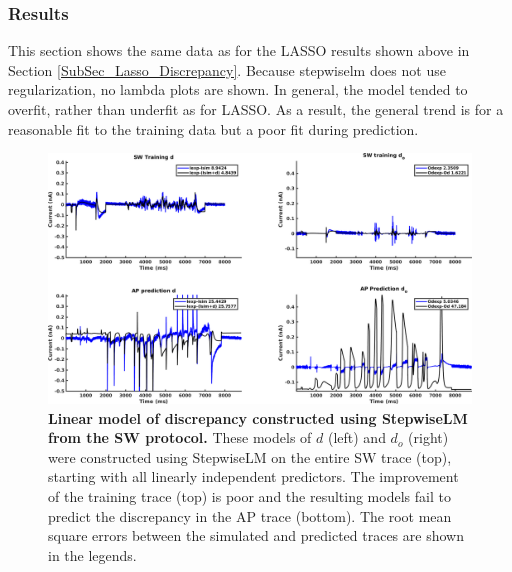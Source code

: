 \documentclass[11pt,a4paper,oneside]{article}
\begin{document}
\subsubsection{Results}\label{SubSubSec_StepwiseLM_Results}
This section shows the same data as for the LASSO results shown above in Section \ref{SubSec_Lasso_Discrepancy}. Because stepwiselm does not use regularization, no lambda plots are shown. In general, the model tended to overfit, rather than underfit as for LASSO. As a result, the general trend is for a reasonable fit to the training data but a poor fit during prediction.

\begin{figure}[t]
\begin{center}
\includegraphics[scale=0.42]{Figures/StepwiseLM_SW_AP_full_discrepancy.png}
\caption{\textbf{Linear model of discrepancy constructed using StepwiseLM from the SW protocol.} These models of $d$ (left) and $d_o$ (right) were constructed using StepwiseLM on the entire SW trace (top), starting with all linearly independent predictors. The improvement of the training trace (top) is poor and the resulting models fail to predict the discrepancy in the AP trace (bottom). The root mean square errors between the simulated and predicted traces are shown in the legends. } 
\label{Fig_StepwiseLM_SW_AP_full_discrepancy}
\end{center}
\end{figure}
\end{document}
